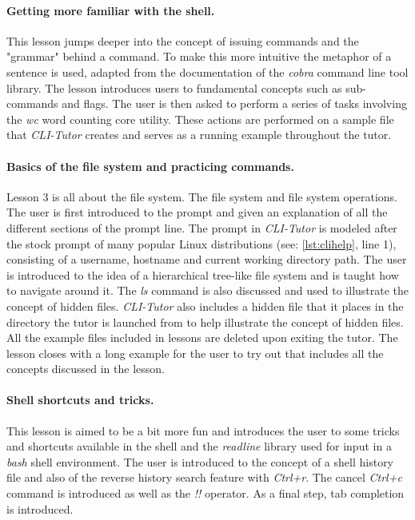 \paragraph{Getting more familiar with the shell.} This lesson jumps deeper into
the concept of issuing commands and the "grammar" behind a command. To make
this more intuitive the metaphor of a sentence is used, adapted from the
documentation of the \textit{cobra} command line tool
library\cite{franciacobra}. The lesson introduces users to fundamental concepts
such as sub-commands and flags. The user is then asked to perform a series of
tasks involving the \textit{wc} word counting core utility. These actions are
performed on a sample file that \textit{CLI-Tutor} creates and serves as a
running example throughout the tutor.

\paragraph{Basics of the file system and practicing commands.} Lesson 3 is all
about the file system. The file system and file system operations. The user is
first introduced to the prompt and given an explanation of all the different
sections of the prompt line. The prompt in \textit{CLI-Tutor} is modeled after
the stock prompt of many popular Linux distributions (see:
\autoref{lst:clihelp}, line 1), consisting of a username, hostname and current
working directory path. The user is introduced to the idea of a hierarchical
tree-like file system and is taught how to navigate around it. The \textit{ls}
command is also discussed and used to illustrate the concept of hidden files.
\textit{CLI-Tutor} also includes a hidden file that it places in the directory
the tutor is launched from to help illustrate the concept of hidden files. All
the example files included in lessons are deleted upon exiting the tutor. The
lesson closes with a long example for the user to try out that includes all the
concepts discussed in the lesson.

\paragraph{Shell shortcuts and tricks.} This lesson is aimed to be a bit more
fun and introduces the user to some tricks and shortcuts available in the shell
and the \textit{readline}\cite{ramey_fox_readline} library used for input in a
\textit{bash} shell environment. The user is introduced to the concept of a
shell history file and also of the reverse history search feature with
\textit{Ctrl+r}. The cancel \textit{Ctrl+c} command is introduced as well
as the \textit{!!} operator. As a final step, tab completion is introduced.

